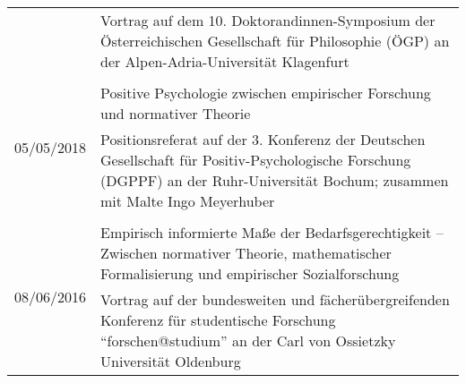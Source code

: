 \documentclass[a4paper,10pt]{article}
\begin{document}
\begin{longtable}{p{}p{}}
& \footnotesize{Vortrag auf dem 10. Doktorandinnen-Symposium der Österreichischen Gesellschaft für Philosophie (ÖGP) an der Alpen-Adria-Universität Klagenfurt}\\
\\
\multirow{2}{1,75cm}{\footnotesize{05/05/2018}} & Positive Psychologie zwischen empirischer Forschung und normativer Theorie\\
& \footnotesize{Positionsreferat auf der 3. Konferenz der Deutschen Gesellschaft für Positiv-Psychologische Forschung (DGPPF) an der Ruhr-Universität Bochum; zusammen mit Malte Ingo Meyerhuber}\\
\\
\multirow{2}{1,75cm}{\footnotesize{08/06/2016}} & Empirisch informierte Maße der Bedarfsgerechtigkeit -- Zwischen normativer Theorie, mathematischer Formalisierung und empirischer Sozialforschung\\
& \footnotesize{Vortrag auf der bundesweiten und fächerübergreifenden Konferenz für studentische Forschung \enquote{forschen@studium} an der Carl von Ossietzky Universität Oldenburg}\\
\end{longtable}
\end{document}
